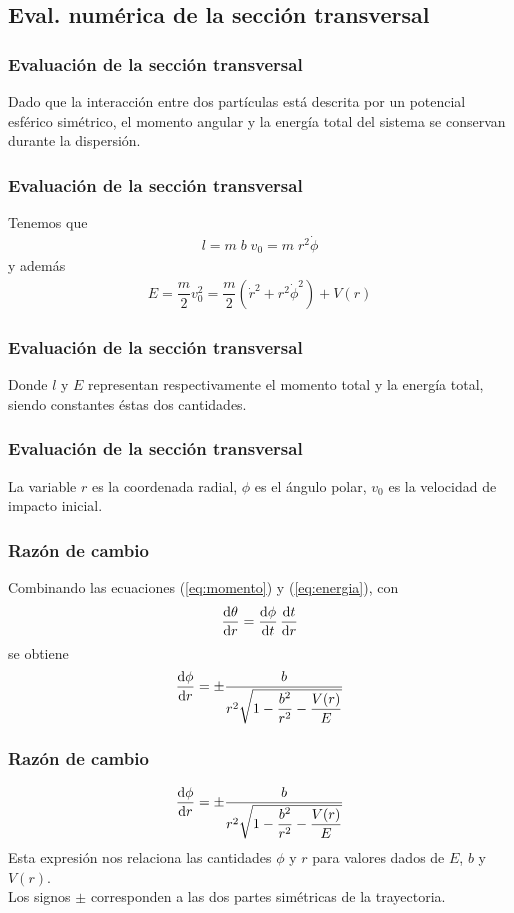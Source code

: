 \subsection{Eval. numérica de la sección transversal}
\begin{frame}
\frametitle{Evaluación de la sección transversal}
Dado que la interacción entre dos partículas está descrita por un potencial esférico simétrico, el momento angular y la energía total del sistema se conservan durante la dispersión.
\end{frame}
\begin{frame}
\frametitle{Evaluación de la sección transversal}
Tenemos que
\begin{align}
l = m \; b \; v_{0} = m \; r^{2} \dot{\phi}
\label{eq:momento}
\end{align}
y además
\begin{align}
E = \dfrac{m}{2} v_{0}^{2} = \dfrac{m}{2} \left( \dot{r}^{2} + r^{2} \dot{\phi}^{2} \right) + V(r)
\label{eq:energia}
\end{align}
\end{frame}
\begin{frame}
\frametitle{Evaluación de la sección transversal}
Donde $l$ y $E$ representan respectivamente el momento total y la energía total, siendo constantes éstas dos cantidades.
\end{frame}
\begin{frame}
\frametitle{Evaluación de la sección transversal}
La variable $r$ es la coordenada radial, $\phi$ es el ángulo polar, $v_{0}$ es la velocidad de impacto inicial.
\end{frame}
\begin{frame}
\frametitle{Razón de cambio}
Combinando las ecuaciones (\ref{eq:momento}) y (\ref{eq:energia}), con
\begin{align}
\dv{\theta}{r} = \dv{\phi}{t} \, \dv{t}{r}
\end{align}
\pause
se obtiene
\begin{align}
\dv{\phi}{r} = \pm \dfrac{b}{r^{2} \sqrt{1 - \dfrac{b^{2}}{r^{2}} - \dfrac{V(r)}{E}}}
\label{eq:dtheta_dr}
\end{align}
\end{frame}
\begin{frame}
\frametitle{Razón de cambio}
\begin{align*}
\dv{\phi}{r} = \pm \dfrac{b}{r^{2} \sqrt{1 - \dfrac{b^{2}}{r^{2}} - \dfrac{V(r)}{E}}}
\end{align*}
Esta expresión nos relaciona las cantidades $\phi$ y $r$ para valores dados de $E$, $b$ y $V(r)$. 
\\
\bigskip
Los signos $\pm$ corresponden a las dos partes simétricas de la trayectoria.
\end{frame}
